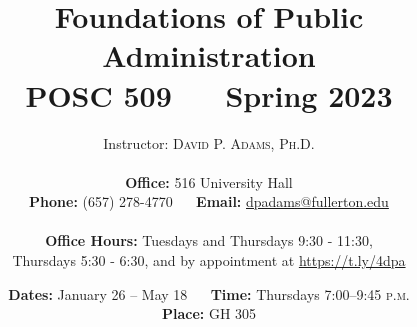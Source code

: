 \documentclass[11pt]{article}
\begin{document}

\title{\textbf{Foundations of Public Administration} \\
POSC 509 ~\textperiodcentered~ Spring 2023}

\author{ \Large{Instructor: \textsc{David P. Adams, Ph.D. }} \\
\\
\textbf{Office:} 516 University Hall \\
\textbf{Phone:} (657) 278-4770 ~\textperiodcentered~ \textbf{Email:} \url{dpadams@fullerton.edu} \\\\
\textbf{Office Hours:}  Tuesdays and Thursdays 9:30 - 11:30, \\  Thursdays 5:30 - 6:30, and by appointment at \url{https://t.ly/4dpa}}

\date{ \textbf{Dates:} January 26 -- May 18 ~\textperiodcentered~ \textbf{Time:} Thursdays 7:00--9:45 \textsc{p.m.} \\\vspace{1ex} \textbf{Place:} GH 305}
\end{document}
